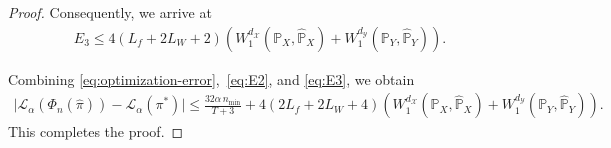 \documentclass{article}
\theoremstyle{plain}
\theoremstyle{definition}
\theoremstyle{remark}
\begin{document}
\begin{proof}
	Consequently, we arrive at
	\begin{align}
		\label{eq:E3}
		E_3 \leq4(L_f + 2L_W + 2)\left(W_1^{d_{\mathcal{X}}}(\mathbb{P}_X,\hat{\mathbb{P}}_X) + W_1^{d_{\mathcal{Y}}}(\mathbb{P}_Y,\hat{\mathbb{P}}_Y)\right) .
	\end{align}
	
	Combining \eqref{eq:optimization-error},~\eqref{eq:E2}, and \eqref{eq:E3}, we obtain
	\begin{align*}
		\Big\vert \mathcal{L}_{\alpha}(\Phi_n(\hat{\pi})) - \mathcal{L}_{\alpha}(\pi^*) \Big\vert \leq \frac{32\alpha \, n_{\min}}{T+3} + 4(2L_f + 2L_W + 4)(W_1^{d_{\mathcal{X}}}(\mathbb{P}_X,\hat{\mathbb{P}}_X) + W_1^{d_{\mathcal{Y}}}(\mathbb{P}_Y,\hat{\mathbb{P}}_Y)) .
	\end{align*}
	This completes the proof.
\end{proof}
\end{document}
